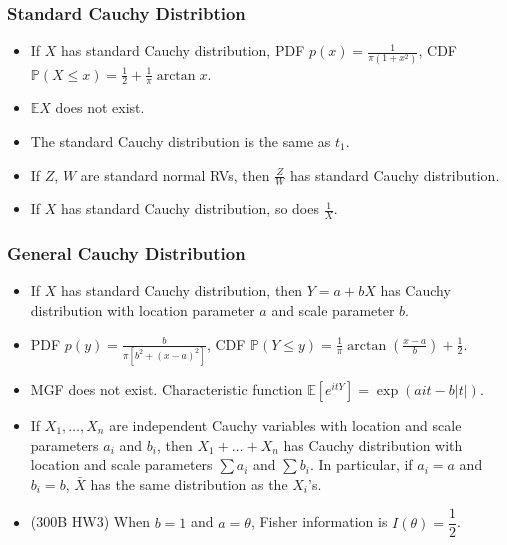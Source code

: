 \documentclass[twoside]{article}
\newcommand\bbE{\mathbb{E}}
\newcommand\bbP{\mathbb{P}}
\def\t{\theta}
\begin{document}
\subsubsection{Standard Cauchy Distribtion}
\begin{itemize}
\item If $X$ has standard Cauchy distribution, PDF $p(x) = \displaystyle\frac{1}{\pi (1+x^2)}$, CDF $\bbP(X \leq x) = \frac{1}{2} + \frac{1}{\pi}\arctan x$.

\item $\bbE X$ does not exist.

\item The standard Cauchy distribution is the same as $t_1$.

\item If $Z$, $W$ are standard normal RVs, then $\displaystyle\frac{Z}{W}$ has standard Cauchy distribution.

\item If $X$ has standard Cauchy distribution, so does $\displaystyle\frac{1}{X}$.

\end{itemize}

\subsubsection{General Cauchy Distribution}
\begin{itemize}
\item If $X$ has standard Cauchy distribution, then $Y = a + bX$ has Cauchy distribution with location parameter $a$ and scale parameter $b$.
\item PDF $p(y) = \displaystyle\frac{b}{\pi [b^2 + (x-a)^2]}$, CDF $\bbP (Y \leq y) = \displaystyle\frac{1}{\pi} \arctan \left( \frac{x-a}{b} \right) + \frac{1}{2}$.

\item MGF does not exist. Characteristic function $\bbE [e^{itY}] = \exp (ait - b |t|)$.

\item If $X_1, \dots, X_n$ are independent Cauchy variables with location and scale parameters $a_i$ and $b_i$, then $X_1 + \dots + X_n$ has Cauchy distribution with location and scale parameters $\sum a_i$ and $\sum b_i$. In particular, if $a_i = a$ and $b_i = b$, $\bar{X}$ has the same distribution as the $X_i$'s.

\item (300B HW3) When $b = 1$ and $a = \t$, Fisher information is $I(\t) = \dfrac{1}{2}$.

\end{itemize}
\end{document}
